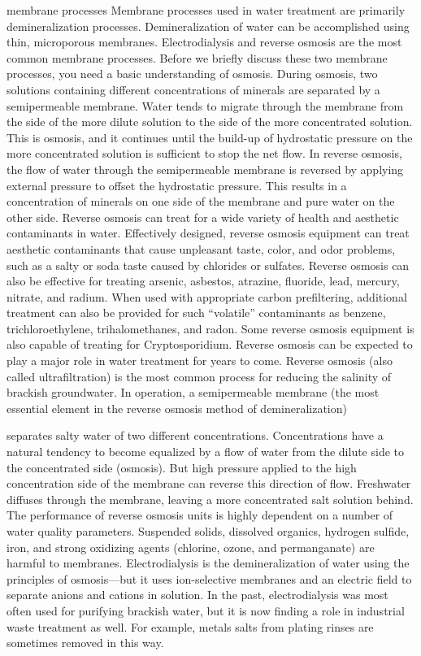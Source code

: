\documentclass{article}
\begin{document}
membrane processes Membrane processes used in water treatment are
primarily demineralization processes. Demineralization of water can be
accomplished using thin, microporous membranes. Electrodialysis and
reverse osmosis are the most common membrane processes. Before we
briefly discuss these two membrane processes, you need a basic
understanding of osmosis. During osmosis, two solutions containing
different concentrations of minerals are separated by a semipermeable
membrane. Water tends to migrate through the membrane from the side of
the more dilute solution to the side of the more concentrated solution.
This is osmosis, and it continues until the build-up of hydrostatic
pressure on the more concentrated solution is sufficient to stop the net
flow. In reverse osmosis, the flow of water through the semipermeable
membrane is reversed by applying external pressure to offset the
hydrostatic pressure. This results in a concentration of minerals on one
side of the membrane and pure water on the other side. Reverse osmosis
can treat for a wide variety of health and aesthetic contaminants in
water. Effectively designed, reverse osmosis equipment can treat
aesthetic contaminants that cause unpleasant taste, color, and odor
problems, such as a salty or soda taste caused by chlorides or sulfates.
Reverse osmosis can also be effective for treating arsenic, asbestos,
atrazine, fluoride, lead, mercury, nitrate, and radium. When used with
appropriate carbon prefiltering, additional treatment can also be
provided for such ``volatile'' contaminants as benzene,
trichloroethylene, trihalomethanes, and radon. Some reverse osmosis
equipment is also capable of treating for Cryptosporidium. Reverse
osmosis can be expected to play a major role in water treatment for
years to come. Reverse osmosis (also called ultrafiltration) is the most
common process for reducing the salinity of brackish groundwater. In
operation, a semipermeable membrane (the most essential element in the
reverse osmosis method of demineralization)

separates salty water of two different concentrations. Concentrations
have a natural tendency to become equalized by a flow of water from the
dilute side to the concentrated side (osmosis). But high pressure
applied to the high concentration side of the membrane can reverse this
direction of flow. Freshwater diffuses through the membrane, leaving a
more concentrated salt solution behind. The performance of reverse
osmosis units is highly dependent on a number of water quality
parameters. Suspended solids, dissolved organics, hydrogen sulfide,
iron, and strong oxidizing agents (chlorine, ozone, and permanganate)
are harmful to membranes. Electrodialysis is the demineralization of
water using the principles of osmosis---but it uses ion-selective
membranes and an electric field to separate anions and cations in
solution. In the past, electrodialysis was most often used for purifying
brackish water, but it is now finding a role in industrial waste
treatment as well. For example, metals salts from plating rinses are
sometimes removed in this way.
\end{document}
